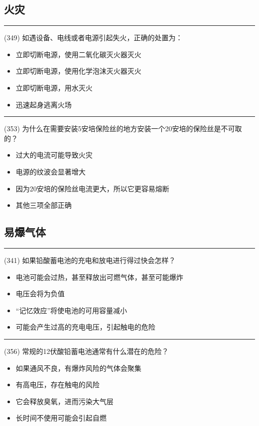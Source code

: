 \documentclass[twocolumn,hyperref,UTF8]{ctexart}  %
\begin{document}
\subsection{火灾}


\noindent\rule{0.5\textwidth}{1pt}
\heiti (349) 如遇设备、电线或者电源引起失火，正确的处置为： \songti {\color{gray} [LK1039] }
\begin{itemize}
	\item  立即切断电源，使用二氧化碳灭火器灭火
	\item  立即切断电源，使用化学泡沫灭火器灭火
	\item  立即切断电源，用水灭火
	\item  迅速起身逃离火场
\end{itemize}


\noindent\rule{0.5\textwidth}{1pt}
\heiti (353) 为什么在需要安装5安培保险丝的地方安装一个20安培的保险丝是不可取的？ \songti {\color{gray} [LK1226] }
\begin{itemize}
	\item  过大的电流可能导致火灾
	\item  电源的纹波会显著增大
	\item  因为20安培的保险丝电流更大，所以它更容易熔断
	\item  其他三项全部正确
\end{itemize}



\clearpage
\subsection{易爆气体}


\noindent\rule{0.5\textwidth}{1pt}
\heiti (341) 如果铅酸蓄电池的充电和放电进行得过快会怎样？ \songti {\color{gray} [LK1231] }
\begin{itemize}
	\item  电池可能会过热，甚至释放出可燃气体，甚至可能爆炸
	\item  电压会将为负值
	\item  “记忆效应”将使电池的可用容量减小
	\item  可能会产生过高的充电电压，引起触电的危险
\end{itemize}


\noindent\rule{0.5\textwidth}{1pt}
\heiti (356) 常规的12伏酸铅蓄电池通常有什么潜在的危险？ \songti {\color{gray} [LK1230] }
\begin{itemize}
	\item  如果通风不良，有爆炸风险的气体会聚集
	\item  有高电压，存在触电的风险
	\item  它会释放臭氧，进而污染大气层
	\item  长时间不使用可能会引起自燃
\end{itemize}
\end{document}
